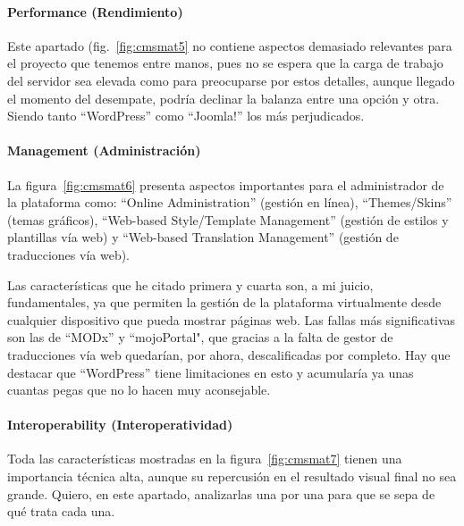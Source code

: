 \paragraph{Performance (Rendimiento)}

\par Este apartado (fig.~\ref{fig:cmsmat5} no contiene aspectos demasiado relevantes para el proyecto que tenemos entre manos, pues no se espera que la carga de trabajo del servidor sea elevada como para preocuparse por estos detalles, aunque llegado el momento del desempate, podría declinar la balanza entre una opción y otra. Siendo tanto ``WordPress'' como ``Joomla!'' los más perjudicados.



\paragraph{Management (Administración)}

\par La figura~\ref{fig:cmsmat6} presenta aspectos importantes para el administrador de la plataforma como: ``Online Administration'' (gestión en línea), ``Themes/Skins'' (temas gráficos), ``Web-based Style/Template Management'' (gestión de estilos y plantillas vía web) y ``Web-based Translation Management'' (gestión de traducciones vía web).


\par Las características que he citado primera y cuarta son, a mi juicio, fundamentales, ya que permiten la gestión de la plataforma virtualmente desde cualquier dispositivo que pueda mostrar páginas web. Las fallas más significativas son las de ``MODx'' y ``mojoPortal", que gracias a la falta de gestor de traducciones vía web quedarían, por ahora, descalificadas por completo. Hay que destacar que ``WordPress'' tiene limitaciones en esto y acumularía ya unas cuantas pegas que no lo hacen muy aconsejable.


\paragraph{Interoperability (Interoperatividad)}
\par Toda las características mostradas en la figura~\ref{fig:cmsmat7} tienen una importancia técnica alta, aunque su repercusión en el resultado visual final no sea grande. Quiero, en este apartado, analizarlas una por una para que se sepa de qué trata cada una.

